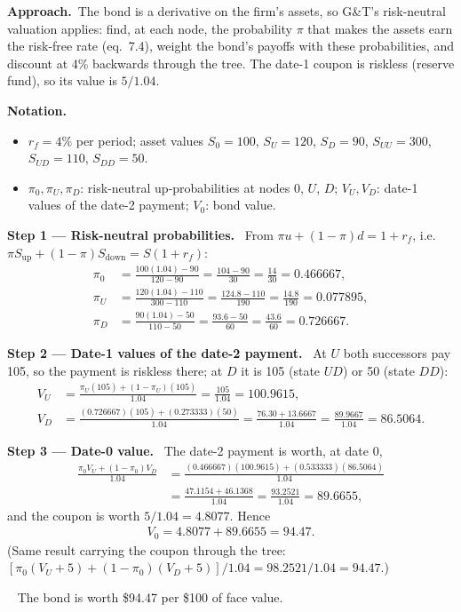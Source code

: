 \documentclass[11pt,a4paper]{article}
\newcommand{\notation}{\par\noindent\textbf{Notation.}}
\newcommand{\step}[2]{\par\medskip\noindent\textbf{Step #1 --- #2.}~}
\newcommand{\approach}{\par\smallskip\noindent\textbf{Approach.}~}
\newcommand{\answer}[1]{\par\smallskip\noindent\fbox{\textbf{Answer #1.}}~}
\begin{document}
\approach The bond is a derivative on the firm's assets, so G\&T's risk-neutral valuation applies: find, at each node, the probability
$\pi$ that makes the assets earn the risk-free rate (eq.~7.4), weight the bond's payoffs with these probabilities, and discount at 4\%
backwards through the tree. The date-1 coupon is riskless (reserve fund), so its value is $5/1.04$.

\notation
\begin{itemize}
  \item $r_f=4\%$ per period; asset values $S_0=100$, $S_U=120$, $S_D=90$, $S_{UU}=300$, $S_{UD}=110$, $S_{DD}=50$.
  \item $\pi_0,\pi_U,\pi_D$: risk-neutral up-probabilities at nodes $0$, $U$, $D$; $V_U,V_D$: date-1 values of the date-2 payment; $V_0$: bond value.
\end{itemize}

\step{1}{Risk-neutral probabilities} From $\pi u+(1-\pi)d=1+r_f$, i.e.\ $\pi S_{\text{up}}+(1-\pi)S_{\text{down}}=S(1+r_f)$:
\begin{align}
  \pi_0 &= \frac{100(1.04)-90}{120-90} = \frac{104-90}{30} = \frac{14}{30} = 0.466667, \label{r2be15-p0}\\
  \pi_U &= \frac{120(1.04)-110}{300-110} = \frac{124.8-110}{190} = \frac{14.8}{190} = 0.077895, \label{r2be15-pU}\\
  \pi_D &= \frac{90(1.04)-50}{110-50} = \frac{93.6-50}{60} = \frac{43.6}{60} = 0.726667. \label{r2be15-pD}
\end{align}

\step{2}{Date-1 values of the date-2 payment} At $U$ both successors pay 105, so the payment is riskless there; at $D$ it is
105 (state $UD$) or 50 (state $DD$):
\begin{align}
  V_U &= \frac{\pi_U(105)+(1-\pi_U)(105)}{1.04} = \frac{105}{1.04} = 100.9615, \label{r2be15-VU}\\
  V_D &= \frac{(0.726667)(105)+(0.273333)(50)}{1.04} = \frac{76.30+13.6667}{1.04} = \frac{89.9667}{1.04} = 86.5064. \label{r2be15-VD}
\end{align}

\step{3}{Date-0 value} The date-2 payment is worth, at date 0,
\begin{align}
  \frac{\pi_0V_U+(1-\pi_0)V_D}{1.04} &= \frac{(0.466667)(100.9615)+(0.533333)(86.5064)}{1.04} \nonumber\\
  &= \frac{47.1154+46.1368}{1.04} = \frac{93.2521}{1.04} = 89.6655, \label{r2be15-V2}
\end{align}
and the coupon is worth $5/1.04=4.8077$. Hence
\begin{align}
  V_0 = 4.8077 + 89.6655 = 94.47. \label{r2be15-V0}
\end{align}
(Same result carrying the coupon through the tree: $[\pi_0(V_U+5)+(1-\pi_0)(V_D+5)]/1.04 = 98.2521/1.04 = 94.47$.)
\answer{\unskip} The bond is worth \$94.47 per \$100 of face value.
\end{document}
